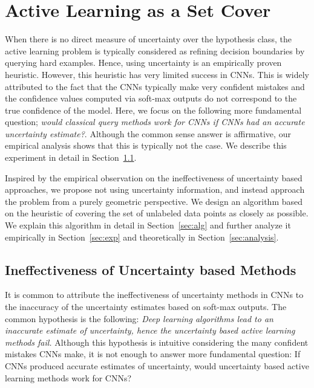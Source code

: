 \documentclass{article}
\begin{document}
\section{Active Learning as a Set Cover}
When there is no direct measure of uncertainty over the hypothesis class, the active learning problem is typically considered as refining decision boundaries by querying hard examples. Hence, using uncertainty is an empirically proven heuristic. However, this heuristic has very limited success in CNNs. This is widely attributed to the fact that the CNNs typically make very confident mistakes and the confidence values computed via soft-max outputs do not correspond to the true confidence of the model. Here, we focus on the following more fundamental question; \emph{would classical query methods work for CNNs if CNNs had an accurate uncertainty estimate?}. Although the common sense answer is affirmative, our empirical analysis shows that this is typically not the case. We describe this experiment in detail in Section~\ref{sec:whatif}.

Inspired by the empirical observation on the ineffectiveness of uncertainty based approaches, we propose not using uncertainty information, and instead approach the problem from a purely geometric perspective. We design an algorithm based on the heuristic of covering the set of unlabeled data points as closely as possible. We explain this algorithm in detail in Section~\ref{sec:alg} and further analyze it empirically in Section~\ref{sec:exp} and theoretically in Section~\ref{sec:analysis}.

\subsection{Ineffectiveness of Uncertainty based Methods}
\label{sec:whatif}
It is common to attribute the ineffectiveness of uncertainty methods in CNNs to the inaccuracy of the uncertainty estimates based on soft-max outputs. The common hypothesis is the following: \emph{Deep learning algorithms lead to an inaccurate estimate of uncertainty, hence the uncertainty based active learning methods fail.} Although this hypothesis is intuitive considering the many confident mistakes CNNs make, it is not enough to answer more fundamental question: If CNNs produced accurate estimates of uncertainty, would uncertainty based active learning methods work for CNNs?
\end{document}
